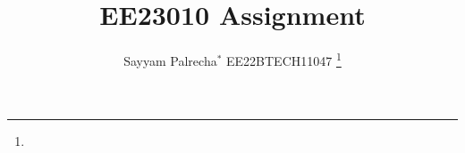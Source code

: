 \documentclass[journal,12pt,onecolumn]{IEEEtran}
\theoremstyle{remark}
\begin{document}



\vspace{3cm}

\title{
EE23010 Assignment
}
\author{ Sayyam Palrecha$^{*}$ EE22BTECH11047%
	\thanks{}
	
}


%
%
%

% 
%



% 
\end{document}
